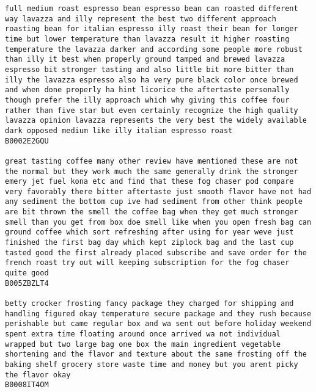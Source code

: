 \documentclass[11pt]{article}
\begin{document}
\begin{Verbatim}[commandchars=\\\{\}]
full medium roast espresso bean espresso bean can roasted different way lavazza and illy represent the best two different approach roasting bean for italian espresso illy roast their bean for longer time but lower temperature than lavazza result it higher roasting temperature the lavazza darker and according some people more robust than illy it best when properly ground tamped and brewed lavazza espresso bit stronger tasting and also little bit more bitter than illy the lavazza espresso also ha very pure black color once brewed and when done properly ha hint licorice the aftertaste personally though prefer the illy approach which why giving this coffee four rather than five star but even certainly recognize the high quality lavazza opinion lavazza represents the very best the widely available dark opposed medium like illy italian espresso roast
B0002E2GQU

great tasting coffee many other review have mentioned these are not the normal but they work much the same generally drink the stronger emery jet fuel kona etc and find that these fog chaser pod compare very favorably there bitter aftertaste just smooth flavor have not had any sediment the bottom cup ive had sediment from other think people are bit thrown the smell the coffee bag when they get much stronger smell than you get from box doe smell like when you open fresh bag can ground coffee which sort refreshing after using for year weve just finished the first bag day which kept ziplock bag and the last cup tasted good the first already placed subscribe and save order for the french roast try out will keeping subscription for the fog chaser quite good
B005ZBZLT4

betty crocker frosting fancy package they charged for shipping and handling figured okay temperature secure package and they rush because perishable but came regular box and wa sent out before holiday weekend spent extra time floating around once arrived wa not individual wrapped but two large bag one box the main ingredient vegetable shortening and the flavor and texture about the same frosting off the baking shelf grocery store waste time and money but you arent picky the flavor okay
B0008IT4OM


\end{Verbatim}
\end{document}
